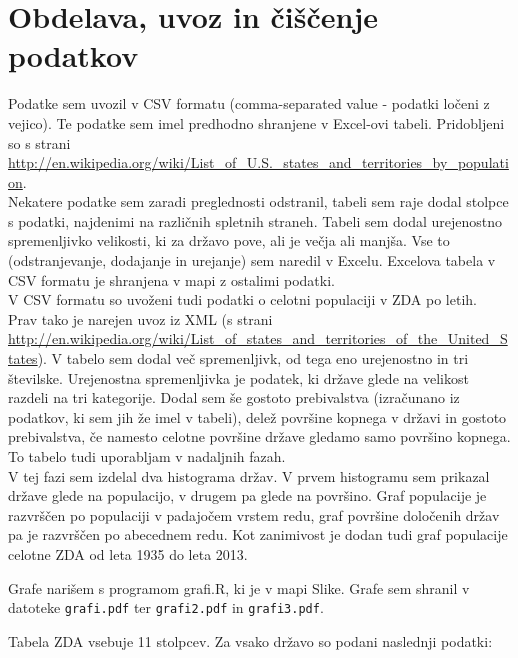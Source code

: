 \documentclass[11pt,a4paper]{article}
\begin{document}
\pagebreak

\section{Obdelava, uvoz in čiščenje podatkov}

Podatke sem uvozil v CSV formatu (comma-separated value - podatki ločeni z vejico). Te podatke sem imel predhodno shranjene v Excel-ovi tabeli. Pridobljeni so s strani \url{http://en.wikipedia.org/wiki/List_of_U.S._states_and_territories_by_population}. \\

Nekatere podatke sem zaradi preglednosti odstranil, tabeli sem raje dodal stolpce s podatki, najdenimi na različnih spletnih straneh. Tabeli sem dodal urejenostno spremenljivko velikosti, ki za državo pove, ali je večja ali manjša. Vse to (odstranjevanje, dodajanje in urejanje) sem naredil v Excelu. Excelova tabela v CSV formatu je shranjena v mapi z ostalimi podatki.\\

V CSV formatu so uvoženi tudi podatki o celotni populaciji v ZDA po letih.\\

Prav tako je narejen uvoz iz XML (s strani \url{http://en.wikipedia.org/wiki/List_of_states_and_territories_of_the_United_States}). V tabelo sem dodal več spremenljivk, od tega eno urejenostno in tri številske. Urejenostna spremenljivka je podatek, ki države glede na velikost razdeli na tri kategorije. Dodal sem še gostoto prebivalstva (izračunano iz podatkov, ki sem jih že imel v tabeli), delež površine kopnega v državi in gostoto prebivalstva, če namesto celotne površine države gledamo samo površino kopnega. To tabelo tudi uporabljam v nadaljnih fazah.\\

V tej fazi sem izdelal dva histograma držav. V prvem histogramu sem prikazal države glede na populacijo, v drugem pa glede na površino.
Graf populacije je razvrščen po populaciji v padajočem vrstem redu, graf površine določenih držav pa je razvrščen po abecednem redu.
Kot zanimivost je dodan tudi graf populacije celotne ZDA od leta 1935 do leta 2013. 

Grafe narišem s programom grafi.R, ki je v mapi Slike. Grafe sem shranil v datoteke 
\verb|grafi.pdf| ter \verb|grafi2.pdf| in \verb|grafi3.pdf|.

\pagebreak 

Tabela ZDA vsebuje 11 stolpcev. Za vsako državo so podani naslednji podatki:
\end{document}
